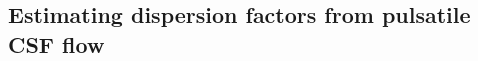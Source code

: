 \documentclass[fleqn,10pt]{wlscirep}
\begin{document}

\subsection{Estimating dispersion factors from pulsatile CSF flow}
\label{sec:app:dispersion}
\end{document}
